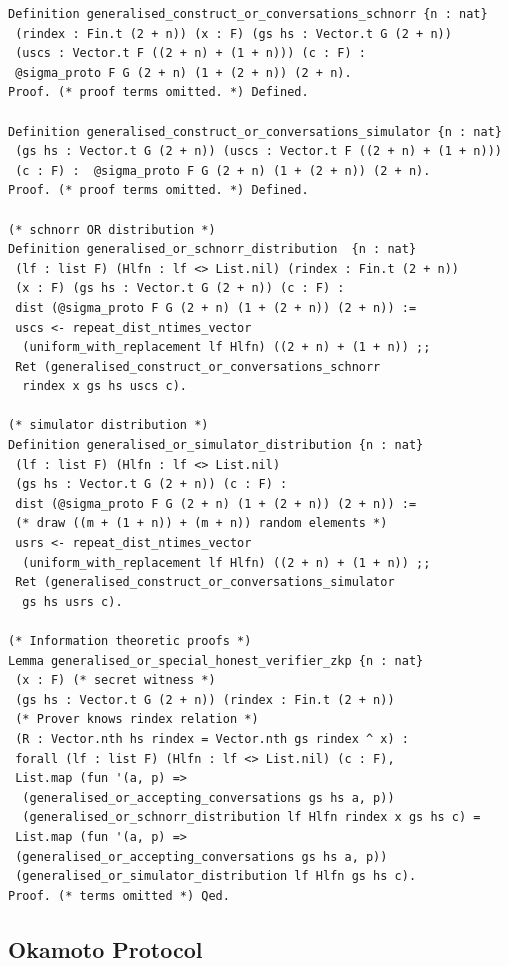 \documentclass[sigconf, anonymous]{acmart}
\begin{document}
\begin{lstlisting}[frame=single, language=Coq, caption={Or-$\Sigma$-Protocol},
label={or_proof},captionpos=t, basicstyle=\ttfamily\footnotesize,
abovecaptionskip=-\medskipamount]
Definition generalised_construct_or_conversations_schnorr {n : nat} 
 (rindex : Fin.t (2 + n)) (x : F) (gs hs : Vector.t G (2 + n))
 (uscs : Vector.t F ((2 + n) + (1 + n))) (c : F) : 
 @sigma_proto F G (2 + n) (1 + (2 + n)) (2 + n).
Proof. (* proof terms omitted. *) Defined.

Definition generalised_construct_or_conversations_simulator {n : nat} 
 (gs hs : Vector.t G (2 + n)) (uscs : Vector.t F ((2 + n) + (1 + n)))  
 (c : F) :  @sigma_proto F G (2 + n) (1 + (2 + n)) (2 + n).
Proof. (* proof terms omitted. *) Defined.

(* schnorr OR distribution *)
Definition generalised_or_schnorr_distribution  {n : nat} 
 (lf : list F) (Hlfn : lf <> List.nil) (rindex : Fin.t (2 + n)) 
 (x : F) (gs hs : Vector.t G (2 + n)) (c : F) : 
 dist (@sigma_proto F G (2 + n) (1 + (2 + n)) (2 + n)) := 
 uscs <- repeat_dist_ntimes_vector 
  (uniform_with_replacement lf Hlfn) ((2 + n) + (1 + n)) ;;
 Ret (generalised_construct_or_conversations_schnorr 
  rindex x gs hs uscs c).

(* simulator distribution *)
Definition generalised_or_simulator_distribution {n : nat} 
 (lf : list F) (Hlfn : lf <> List.nil) 
 (gs hs : Vector.t G (2 + n)) (c : F) : 
 dist (@sigma_proto F G (2 + n) (1 + (2 + n)) (2 + n)) :=
 (* draw ((m + (1 + n)) + (m + n)) random elements *)
 usrs <- repeat_dist_ntimes_vector 
  (uniform_with_replacement lf Hlfn) ((2 + n) + (1 + n)) ;;
 Ret (generalised_construct_or_conversations_simulator 
  gs hs usrs c).

(* Information theoretic proofs *)
Lemma generalised_or_special_honest_verifier_zkp {n : nat}
 (x : F) (* secret witness *)
 (gs hs : Vector.t G (2 + n)) (rindex : Fin.t (2 + n))
 (* Prover knows rindex relation *) 
 (R : Vector.nth hs rindex = Vector.nth gs rindex ^ x) : 
 forall (lf : list F) (Hlfn : lf <> List.nil) (c : F),
 List.map (fun '(a, p) => 
  (generalised_or_accepting_conversations gs hs a, p))
  (generalised_or_schnorr_distribution lf Hlfn rindex x gs hs c) = 
 List.map (fun '(a, p) => 
 (generalised_or_accepting_conversations gs hs a, p))
 (generalised_or_simulator_distribution lf Hlfn gs hs c).
Proof. (* terms omitted *) Qed.

\end{lstlisting}

\subsection{Okamoto Protocol}
\end{document}
